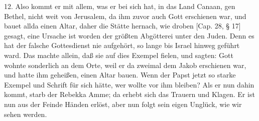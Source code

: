 12. Also kommt er mit allem, was er bei sich hat, in das Land Canaan, gen Bethel, nicht weit von Jerusalem, da ihm zuvor auch Gott erschienen war, und bauet allda einen Altar, daher die Stätte hernach, wie droben [Cap. 28, § 17] gesagt, eine Ursache ist worden der größten Abgötterei unter den Juden. Denn es hat der falsche Gottesdienst nie aufgehört, so lange bis Israel hinweg geführt ward. Das machte allein, daß sie auf dies Exempel fielen, und sagten: Gott wohnte sonderlich an dem Orte, weil er da zweimal dem Jakob erschienen war, und hatte ihm geheißen, einen Altar bauen. Wenn der Papst jetzt so starke Exempel und Schrift
für sich hätte, wer wollte vor ihm bleiben? Als er nun dahin kommt, starb der Rebekka Amme; da erhebt sich das Trauern und Klagen. Er ist nun aus der Feinde Händen erlöst, aber nun folgt sein eigen Unglück, wie wir sehen werden.

